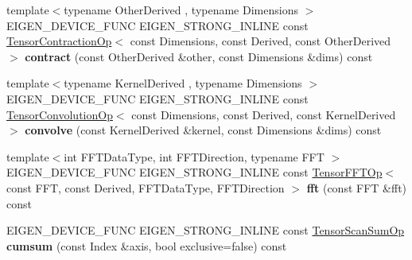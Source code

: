 \begin{DoxyCompactItemize}
\item 
\mbox{\label{class_eigen_1_1_tensor_base_3_01_derived_00_01_read_only_accessors_01_4_ad17da0a41fe59cdca3790426287f2698}} 
{\footnotesize template$<$typename Other\+Derived , typename Dimensions $>$ }\\E\+I\+G\+E\+N\+\_\+\+D\+E\+V\+I\+C\+E\+\_\+\+F\+U\+NC E\+I\+G\+E\+N\+\_\+\+S\+T\+R\+O\+N\+G\+\_\+\+I\+N\+L\+I\+NE const \hyperlink{class_eigen_1_1_tensor_contraction_op}{Tensor\+Contraction\+Op}$<$ const Dimensions, const Derived, const Other\+Derived $>$ {\bfseries contract} (const Other\+Derived \&other, const Dimensions \&dims) const
\item 
\mbox{\label{class_eigen_1_1_tensor_base_3_01_derived_00_01_read_only_accessors_01_4_a615d30d134e3cabebaf1f401be481723}} 
{\footnotesize template$<$typename Kernel\+Derived , typename Dimensions $>$ }\\E\+I\+G\+E\+N\+\_\+\+D\+E\+V\+I\+C\+E\+\_\+\+F\+U\+NC E\+I\+G\+E\+N\+\_\+\+S\+T\+R\+O\+N\+G\+\_\+\+I\+N\+L\+I\+NE const \hyperlink{class_eigen_1_1_tensor_convolution_op}{Tensor\+Convolution\+Op}$<$ const Dimensions, const Derived, const Kernel\+Derived $>$ {\bfseries convolve} (const Kernel\+Derived \&kernel, const Dimensions \&dims) const
\item 
\mbox{\label{class_eigen_1_1_tensor_base_3_01_derived_00_01_read_only_accessors_01_4_ab91a1764cffa1f6edeb68692818135cd}} 
{\footnotesize template$<$int F\+F\+T\+Data\+Type, int F\+F\+T\+Direction, typename F\+FT $>$ }\\E\+I\+G\+E\+N\+\_\+\+D\+E\+V\+I\+C\+E\+\_\+\+F\+U\+NC E\+I\+G\+E\+N\+\_\+\+S\+T\+R\+O\+N\+G\+\_\+\+I\+N\+L\+I\+NE const \hyperlink{class_eigen_1_1_tensor_f_f_t_op}{Tensor\+F\+F\+T\+Op}$<$ const F\+FT, const Derived, F\+F\+T\+Data\+Type, F\+F\+T\+Direction $>$ {\bfseries fft} (const F\+FT \&fft) const
\item 
\mbox{\label{class_eigen_1_1_tensor_base_3_01_derived_00_01_read_only_accessors_01_4_ae1b03d256da95a9d96ba7f911e822611}} 
E\+I\+G\+E\+N\+\_\+\+D\+E\+V\+I\+C\+E\+\_\+\+F\+U\+NC E\+I\+G\+E\+N\+\_\+\+S\+T\+R\+O\+N\+G\+\_\+\+I\+N\+L\+I\+NE const \hyperlink{class_eigen_1_1_tensor_scan_op}{Tensor\+Scan\+Sum\+Op} {\bfseries cumsum} (const Index \&axis, bool exclusive=false) const

\end{DoxyCompactItemize}
